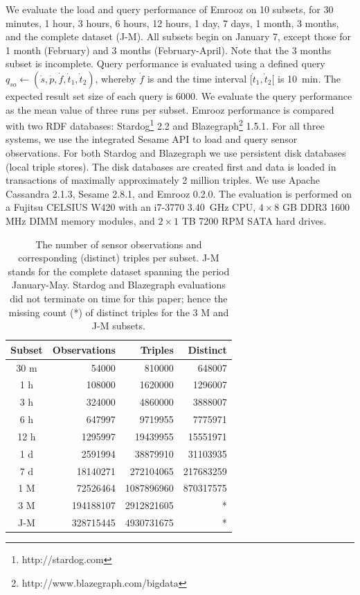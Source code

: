 \documentclass[preprint,12pt,authoryear]{elsarticle}
\begin{document}
We evaluate the load and query performance of Emrooz on 10 subsets, for 30 minutes, 1 hour, 3 hours, 6 hours, 12 hours, 1 day, 7 days, 1 month, 3 months, and the complete dataset (J-M). All subsets begin on January 7, except those for 1 month (February) and 3 months (February-April). Note that the 3 months subset is incomplete. Query performance is evaluated using a defined query $q_{so} \leftarrow (\dot{s},\dot{p},\dot{f},\dot{t}_1,\dot{t}_2)$, whereby $\dot{f}$ is  and the time interval $[\dot{t}_1,\dot{t}_2[$ is \SI{10}{\minute}. The expected result set size of each query is \num{6000}. We evaluate the query performance as the mean value of three runs per subset. Emrooz performance is compared with two RDF databases: Stardog\footnote{http://stardog.com} 2.2 and Blazegraph\footnote{http://www.blazegraph.com/bigdata} 1.5.1. For all three systems, we use the integrated Sesame API to load and query sensor observations. For both Stardog and Blazegraph we use persistent disk databases (local triple stores). The disk databases are created first and data is loaded in transactions of maximally approximately 2 million triples. We use Apache Cassandra 2.1.3, Sesame 2.8.1, and Emrooz 0.2.0. The evaluation is performed on a Fujitsu CELSIUS W420 with an i7-3770 \SI{3.40}{\giga\hertz} CPU, $4 \times 8$ GB DDR3 1600 MHz DIMM memory modules, and $2 \times 1$ TB 7200 RPM SATA hard drives.

\begin{table}
	\centering
	\caption{The number of sensor observations and corresponding (distinct) triples per subset. J-M stands for the complete dataset spanning the period January-May. Stardog and Blazegraph evaluations did not terminate on time for this paper; hence the missing count (*) of distinct triples for the 3 M and J-M subsets.}
	\begin{tabular}{|c|r|r|r|}
		\hline
		Subset & Observations & Triples & Distinct \\
		\hline
		30 m & \num{54000} & \num{810000} & \num{648007} \\
		1 h & \num{108000} & \num{1620000} & \num{1296007} \\
		3 h & \num{324000} & \num{4860000} & \num{3888007} \\
		6 h & \num{647997} & \num{9719955} & \num{7775971} \\
		12 h & \num{1295997} & \num{19439955} & \num{15551971} \\
		1 d & \num{2591994} & \num{38879910} & \num{31103935} \\
		7 d & \num{18140271} & \num{272104065} & \num{217683259} \\
		1 M & \num{72526464} & \num{1087896960} & \num{870317575} \\
		3 M & \num{194188107} & \num{2912821605} & * \\
		J-M & \num{328715445} & \num{4930731675} & * \\
		\hline 
	\end{tabular}
	\label{tbl:size-summary}
\end{table}
\end{document}
